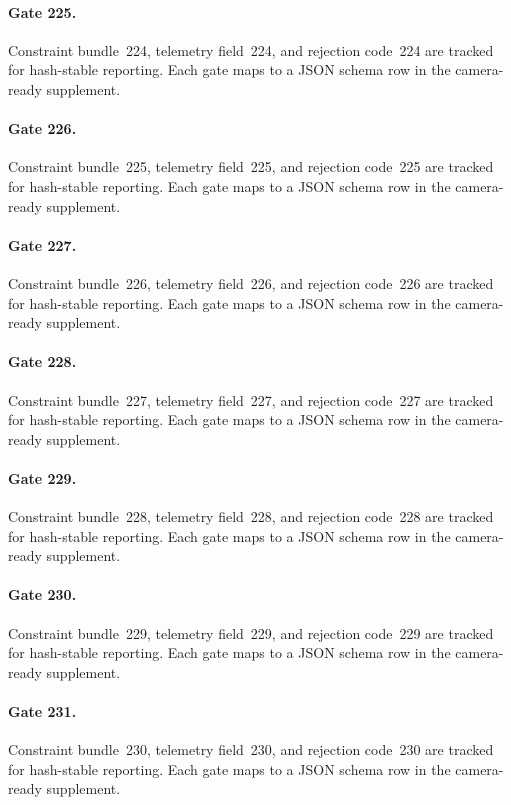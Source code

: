 \documentclass[sigconf,nonacm]{acmart}
\begin{document}
\paragraph{Gate 225.}
Constraint bundle~224, telemetry field~224, and rejection code~224 are tracked for hash-stable reporting. Each gate maps to a JSON schema row in the camera-ready supplement. %

\paragraph{Gate 226.}
Constraint bundle~225, telemetry field~225, and rejection code~225 are tracked for hash-stable reporting. Each gate maps to a JSON schema row in the camera-ready supplement. %

\paragraph{Gate 227.}
Constraint bundle~226, telemetry field~226, and rejection code~226 are tracked for hash-stable reporting. Each gate maps to a JSON schema row in the camera-ready supplement. %

\paragraph{Gate 228.}
Constraint bundle~227, telemetry field~227, and rejection code~227 are tracked for hash-stable reporting. Each gate maps to a JSON schema row in the camera-ready supplement. %

\paragraph{Gate 229.}
Constraint bundle~228, telemetry field~228, and rejection code~228 are tracked for hash-stable reporting. Each gate maps to a JSON schema row in the camera-ready supplement. %

\paragraph{Gate 230.}
Constraint bundle~229, telemetry field~229, and rejection code~229 are tracked for hash-stable reporting. Each gate maps to a JSON schema row in the camera-ready supplement. %

\paragraph{Gate 231.}
Constraint bundle~230, telemetry field~230, and rejection code~230 are tracked for hash-stable reporting. Each gate maps to a JSON schema row in the camera-ready supplement. %
\end{document}

